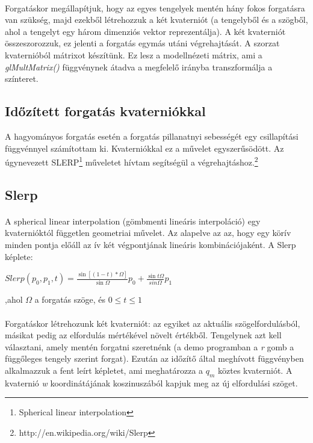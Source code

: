 \documentclass[10pt,a4paper]{article}
\begin{document}
\paragraph*{}
Forgatáskor megállapítjuk, hogy az egyes tengelyek mentén hány fokos forgatásra van szükség, majd ezekből létrehozzuk a két kvaterniót (a tengelyből és a szögből, ahol a tengelyt egy három dimenziós vektor reprezentálja). A két kvaterniót összeszorozzuk, ez jelenti a forgatás egymás utáni végrehajtását. A szorzat kvaternióból mátrixot készítünk. Ez lesz a modellnézeti mátrix, ami a \textit{glMultMatrix()} függvénynek átadva a megfelelő irányba transzformálja a színteret.
\subsection*{Időzített forgatás kvaterniókkal}
A hagyományos forgatás esetén a forgatás pillanatnyi sebességét egy csillapítási függvénnyel számítottam ki. Kvaterniókkal ez a művelet egyszerűsödött. Az úgynevezett SLERP\footnote{Spherical linear interpolation} műveletet hívtam segítségül a végrehajtáshoz.\footnote{http://en.wikipedia.org/wiki/Slerp}
\subsection*{Slerp}
\paragraph*{}
A spherical linear interpolation (gömbmenti lineáris interpoláció) egy kvaternióktól független geometriai művelet. Az alapelve az az, hogy egy körív minden pontja előáll az ív két végpontjának lineáris kombinációjaként. A Slerp képlete:
\begin{center}
$Slerp(p_0, p_1, t) = \frac{\sin{[(1-t)*\Omega]}}{\sin{\Omega}}p_0 + \frac{\sin{t\Omega}}{sin{\Omega}}p_1 $
\end{center}
,ahol \textit{$\Omega$} a forgatás szöge, és $0 \le \textit{t} \le 1$
\paragraph*{}
Forgatáskor létrehozunk két kvaterniót: az egyiket az aktuális szögelfordulásból, másikat pedig az elfordulás mértékével növelt értékből. Tengelynek azt kell választani, amely mentén forgatni szeretnénk (a demo programban a \textit{r} gomb a függőleges tengely szerint forgat). Ezután az időzítő által meghívott függvényben alkalmazzuk a fent leírt képletet, ami meghatározza a $q_m$ köztes kvaterniót. A kvaternió \textit{w} koordinátájának koszinuszából kapjuk meg az új elfordulási szöget.
\end{document}
